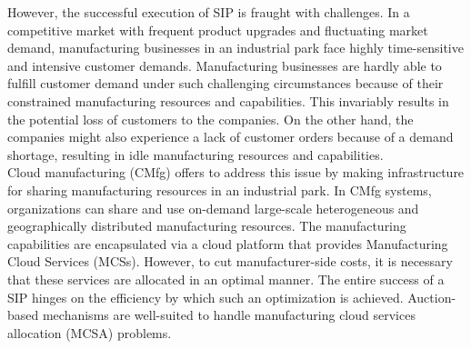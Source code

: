 \documentclass[paper=a4wide, fontsize=12pt]{scrartcl}
\begin{document}
However, the successful execution of SIP is fraught with challenges. In a competitive market with frequent product upgrades and fluctuating market demand, manufacturing businesses in an industrial park face highly time-sensitive and intensive customer demands. Manufacturing businesses are hardly able to fulfill customer demand under such challenging circumstances because of their constrained manufacturing resources and capabilities. This invariably results in the potential loss of customers to the companies. On the other hand, the companies might also experience a lack of customer orders because of a demand shortage, resulting in idle manufacturing resources and capabilities. \\

Cloud manufacturing (CMfg) offers to address this issue by making infrastructure for sharing manufacturing resources in an industrial park. In CMfg systems, organizations can share and use on-demand large-scale heterogeneous and geographically distributed manufacturing resources. The manufacturing capabilities are encapsulated via a cloud platform that provides Manufacturing Cloud Services (MCSs). However, to cut manufacturer-side costs, it is necessary that these services are allocated in an optimal manner. The entire success of a SIP hinges on the efficiency by which such an optimization is achieved. Auction-based mechanisms \cite{Kang2022} are well-suited to handle manufacturing cloud services allocation (MCSA) problems. \\
\end{document}
